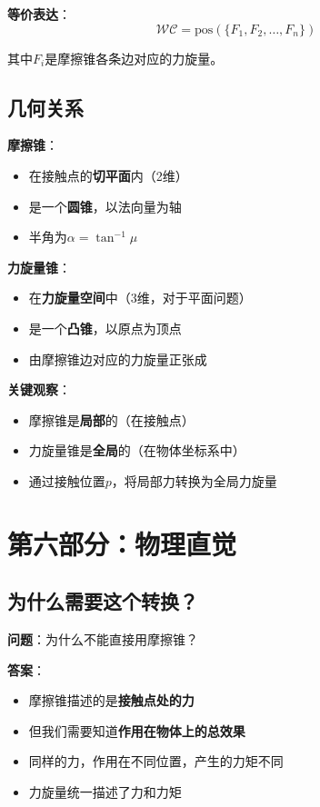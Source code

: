 \documentclass[12pt,a4paper]{article}
\begin{document}
\textbf{等价表达}：
\begin{equation}
\mathcal{WC} = \text{pos}(\{F_1, F_2, \ldots, F_n\})
\end{equation}

其中$F_i$是摩擦锥各条边对应的力旋量。

\subsection{几何关系}

\textbf{摩擦锥}：
\begin{itemize}
\item 在接触点的\textbf{切平面}内（2维）
\item 是一个\textbf{圆锥}，以法向量为轴
\item 半角为$\alpha = \tan^{-1}\mu$
\end{itemize}

\textbf{力旋量锥}：
\begin{itemize}
\item 在\textbf{力旋量空间}中（3维，对于平面问题）
\item 是一个\textbf{凸锥}，以原点为顶点
\item 由摩擦锥边对应的力旋量正张成
\end{itemize}

\textbf{关键观察}：
\begin{itemize}
\item 摩擦锥是\textbf{局部}的（在接触点）
\item 力旋量锥是\textbf{全局}的（在物体坐标系中）
\item 通过接触位置$p$，将局部力转换为全局力旋量
\end{itemize}

\section{第六部分：物理直觉}

\subsection{为什么需要这个转换？}

\textbf{问题}：为什么不能直接用摩擦锥？

\textbf{答案}：
\begin{itemize}
\item 摩擦锥描述的是\textbf{接触点处的力}
\item 但我们需要知道\textbf{作用在物体上的总效果}
\item 同样的力，作用在不同位置，产生的力矩不同
\item 力旋量统一描述了力和力矩
\end{itemize}
\end{document}

